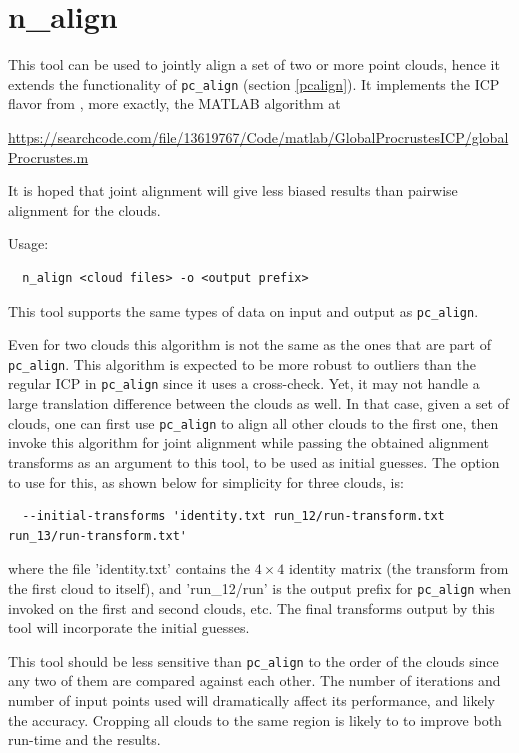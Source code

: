 \section{n\_align}
\label{nalign}

This tool can be used to jointly align a set of two or more point clouds, hence it extends
the functionality of \texttt{pc\_align} (section \ref{pcalign}). It implements the 
ICP flavor from \cite{toldo2010global}, more exactly, 
the MATLAB algorithm at
\begin{center}
\url{https://searchcode.com/file/13619767/Code/matlab/GlobalProcrustesICP/globalProcrustes.m}
\end{center}

It is hoped that joint alignment will give
less biased results than pairwise alignment for the clouds.  

\medskip
Usage:
\begin{verbatim}
  n_align <cloud files> -o <output prefix>
\end{verbatim}

This tool supports the same types of data on input and output as \texttt{pc\_align}. 

Even for two clouds this algorithm is not the same as the ones that are
part of \texttt{pc\_align}. This algorithm is expected to be more
robust to outliers than the regular ICP in \texttt{pc\_align} since it
uses a cross-check. Yet, it may not handle a large translation
difference between the clouds as well. In that case, given a set of
clouds, one can first use \texttt{pc\_align} to align all other clouds
to the first one, then invoke this algorithm for joint alignment while
passing the obtained alignment transforms as an argument to this tool,
to be used as initial guesses. The option to use for this, as shown
below for simplicity for three clouds, is:

\begin{verbatim}
  --initial-transforms 'identity.txt run_12/run-transform.txt run_13/run-transform.txt'
\end{verbatim}

where the file 'identity.txt' contains the $4 \times 4$ identity matrix (the transform 
from the first cloud to itself), and 'run\_12/run' is the output prefix for \texttt{pc\_align}
when invoked on the first and second clouds, etc. The final transforms output by this tool
will incorporate the initial guesses.  

This tool should be less sensitive than \texttt{pc\_align} to the order of the clouds 
since any two of them are compared against each other. The number of iterations and number
of input points used will dramatically affect its performance, and likely the accuracy. 
Cropping all clouds to the same region is likely to to improve both run-time and the results. 
 

